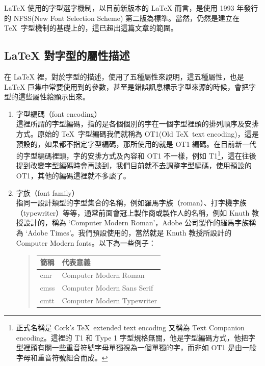 \LaTeX{} 使用的字型選字機制，以目前新版本的 \LaTeX{} 而言，是使用 1993 年發行的 NFSS(New Font Selection Scheme) 第二版為標準。當然，仍然是建立在 \TeX\ 字型機制的基礎上的，這已超出這篇文章的範圍。

\subsection{\LaTeX{} 對字型的屬性描述}
\label{subsec:font-attr}

在 \LaTeX{} 裡，對於字型的描述，使用了五種屬性來說明，這五種屬性，也是 \LaTeX{} 巨集中常要使用到的參數，甚至是錯誤訊息標示字型來源的時候，會把字型的這些屬性給顯示出來。

\begin{enumerate}
   \item 字型編碼（font encoding）\\
         這裡所謂的字型編碼，指的是各個個別的字在一個字型裡頭的排列順序及安排方式。原始的 \TeX\ 字型編碼我們就稱為 OT1(Old \TeX\ text encoding)，這是預設的，如果都不指定字型編碼，那所使用的就是 OT1 編碼。在目前新一代的字型編碼裡頭，字的安排方式及內容和 OT1 不一樣，例如
         T1\footnote{正式名稱是 Cork's \TeX\ extended text encoding 又稱為 Text Companion encoding。這裡的 T1 和 Type 1 字型規格無關，他是字型編碼方式，他把字型裡頭有關一些重音符號字母單獨視為一個單獨的字，而非如 OT1 是由一般字母和重音符號組合而成。}，這在往後提到改變字型編碼時會再談到，我們目前就不去調整字型編碼，使用預設的 OT1，其他的編碼這裡就不多談了。

   \item 字族（font family）\\
         指同一設計類型的字型集合的名稱，例如羅馬字族（roman）、打字機字族（typewriter）等等，通常前面會冠上製作商或製作人的名稱，例如 Knuth 教授設計的，稱為 `Computer Modern Roman'，Adobe 公司製作的羅馬字族稱為 `Adobe Times'。我們預設使用的，當然就是 Knuth 教授所設計的 Computer Modern fonts。以下為一些例子：

         \begin{quote}
            \begin{tabular}{>{\ttfamily}ll}
               簡稱 & 代表意義                   \\
               \hline
               cmr  & Computer Modern Roman      \\
               cmss & Computer Modern Sans Serif \\
               cmtt & Computer Modern Typewriter
            \end{tabular}
         \end{quote}


\end{enumerate}
